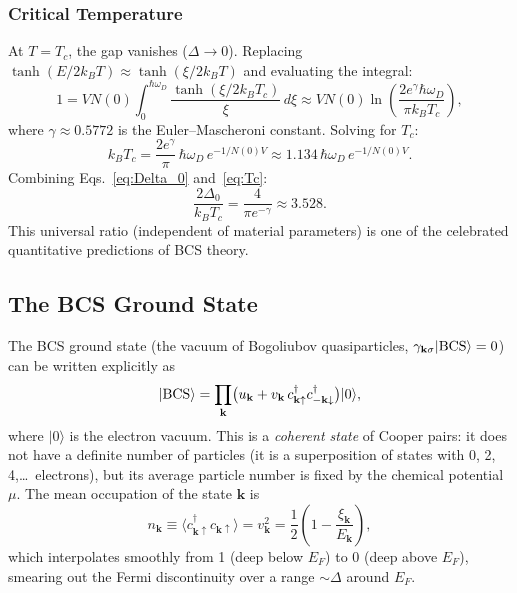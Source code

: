 \subsubsection{Critical Temperature}

At $T = T_c$, the gap vanishes ($\Delta \to 0$). Replacing
$\tanh(E/2k_BT) \approx \tanh(\xi/2k_BT)$ and evaluating the integral:
\begin{equation}
	1 = VN(0)\int_0^{\hbar\omega_D}
	\frac{\tanh(\xi/2k_BT_c)}{\xi}\,d\xi
	\approx VN(0)\ln\!\left(\frac{2e^\gamma \hbar\omega_D}{\pi k_B T_c}\right),
\end{equation}
where $\gamma \approx 0.5772$ is the Euler--Mascheroni constant.
Solving for $T_c$:
\begin{equation}
	\boxed{k_B T_c = \frac{2e^\gamma}{\pi}\,\hbar\omega_D\,
		e^{-1/N(0)V} \approx 1.134\,\hbar\omega_D\, e^{-1/N(0)V}.}
	\label{eq:Tc}
\end{equation}
Combining Eqs.~\eqref{eq:Delta_0} and~\eqref{eq:Tc}:
\begin{equation}
	\frac{2\Delta_0}{k_B T_c} = \frac{4}{\pi e^{-\gamma}} \approx 3.528.
	\label{eq:gap_ratio}
\end{equation}
This universal ratio (independent of material parameters) is one of the
celebrated quantitative predictions of BCS theory.

\subsection{The BCS Ground State}

The BCS ground state (the vacuum of Bogoliubov quasiparticles,
$\gamma_{\mathbf{k}\sigma}|{\rm BCS}\rangle = 0$) can be written explicitly as
\begin{equation}
	|{\rm BCS}\rangle = \prod_{\mathbf{k}}
	\bigl(u_{\mathbf{k}} + v_{\mathbf{k}}\, c^\dagger_{\mathbf{k}\uparrow}
	c^\dagger_{-\mathbf{k}\downarrow}\bigr)|0\rangle,
	\label{eq:BCS_GS}
\end{equation}
where $|0\rangle$ is the electron vacuum. This is a \emph{coherent state} of
Cooper pairs: it does not have a definite number of particles (it is a
superposition of states with 0, 2, 4,\ldots\ electrons), but its average
particle number is fixed by the chemical potential $\mu$. The mean occupation
of the state $\mathbf{k}$ is
\begin{equation}
	n_{\mathbf{k}} \equiv \langle c^\dagger_{\mathbf{k}\uparrow} c_{\mathbf{k}\uparrow}\rangle
	= v_{\mathbf{k}}^2 = \frac{1}{2}\!\left(1 - \frac{\xi_{\mathbf{k}}}{E_{\mathbf{k}}}\right),
\end{equation}
which interpolates smoothly from 1 (deep below $E_F$) to 0 (deep above $E_F$),
smearing out the Fermi discontinuity over a range $\sim \Delta$ around $E_F$.

